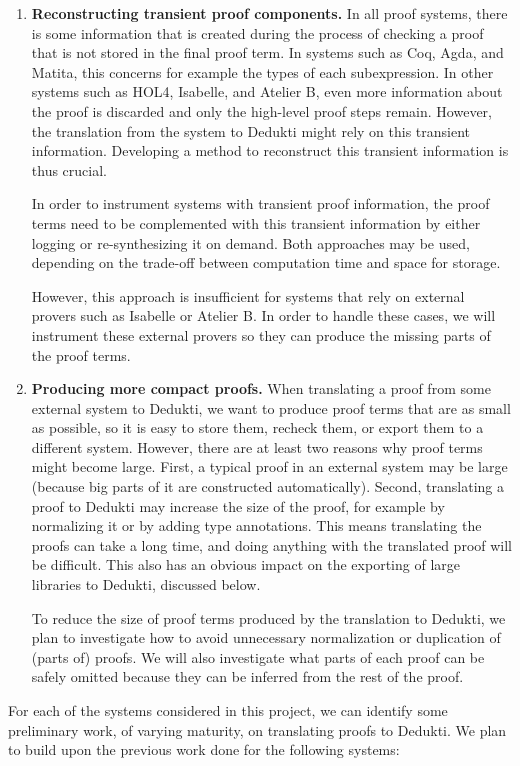 \begin{enumerate}[\bf(a)]
\item{\bf Reconstructing transient proof components.}
In all proof systems, there is some information that is created during
the process of checking a proof that is not stored in the final proof
term. In systems such as Coq, Agda, and Matita, this concerns for
example the types of each subexpression. In other systems such as
HOL4, Isabelle, and Atelier B, even more information about the proof
is discarded and only the high-level proof steps remain.  However, the
translation from the system to Dedukti might rely on this transient
information. Developing a method to reconstruct this transient
information is thus crucial.

In order to instrument systems with transient
proof information, the proof terms need to be complemented with this
transient information by either logging or re-synthesizing it on
demand. Both approaches may be used, depending on the trade-off
between computation time and space for storage.

However, this approach is insufficient for systems that rely on
external provers such as Isabelle or Atelier B. In order to handle
these cases, we will instrument these external
provers so they can produce the missing parts of the proof terms.

\item{\bf Producing more compact proofs.}
When translating a proof from some external system to Dedukti, we want
to produce proof terms that are as small as possible, so it is easy to
store them, recheck them, or export them to a different
system. However, there are at least two reasons why proof terms might
become large. First, a typical proof in an external system may be large
(because big parts of it are constructed automatically). Second,
translating a proof to Dedukti may increase the size of the proof, for
example by normalizing it or by adding type annotations.  This means
translating the proofs can take a long time, and doing anything
with the translated proof will be difficult. This also has an obvious
impact on the exporting of large libraries to Dedukti, discussed
below.

To reduce the size of proof terms produced by the translation to
Dedukti, we plan to investigate how to avoid unnecessary
normalization or duplication of (parts of) proofs. We will also
investigate what parts of each proof can be safely omitted because
they can be inferred from the rest of the proof.
\end{enumerate}

For each of the systems considered in this project, we can identify
some preliminary work, of varying maturity, on translating proofs to
Dedukti.  We plan to build upon the previous work done for the
following systems:


